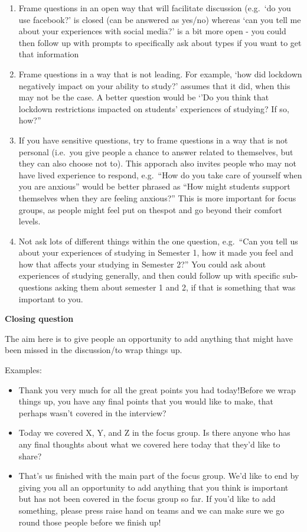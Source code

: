 \documentclass[
  english,
  letterpaper,
  DIV=11,
  numbers=noendperiod]{scrreprt}
\providecommand{\tightlist}{%
  \setlength{\itemsep}{0pt}\setlength{\parskip}{0pt}}
\begin{document}
\begin{enumerate}
\def\labelenumi{\arabic{enumi}.}
\item
  Frame questions in an open way that will facilitate discussion
  (e.g.~`do you use facebook?' is closed (can be answered as yes/no)
  whereas `can you tell me about your experiences with social media?' is
  a bit more open - you could then follow up with prompts to
  specifically ask about types if you want to get that information
\item
  Frame questions in a way that is not leading. For example, `how did
  lockdown negatively impact on your ability to study?' assumes that it
  did, when this may not be the case. A better question would be `'Do
  you think that lockdown restrictions impacted on students' experiences
  of studying? If so, how?''
\item
  If you have sensitive questions, try to frame questions in a way that
  is not personal (i.e.~you give people a chance to answer related to
  themselves, but they can also choose not to). This apporach also
  invites people who may not have lived experience to respond,
  e.g.~``How do you take care of yourself when you are anxious'' would
  be better phrased as ``How might students support themselves when they
  are feeling anxious?'' This is more important for focus groups, as
  people might feel put on thespot and go beyond their comfort levels.
\item
  Not ask lots of different things within the one question, e.g.~``Can
  you tell us about your experiences of studying in Semester 1, how it
  made you feel and how that affects your studying in Semester 2?'' You
  could ask about experiences of studying generally, and then could
  follow up with specific sub-questions asking them about semester 1 and
  2, if that is something that was important to you.
\end{enumerate}

\textbf{Closing question}

The aim here is to give people an opportunity to add anything that might
have been missed in the discussion/to wrap things up.

Examples:

\begin{itemize}
\tightlist
\item
  Thank you very much for all the great points you had today!Before we
  wrap things up, you have any final points that you would like to make,
  that perhaps wasn't covered in the interview?
\item
  Today we covered X, Y, and Z in the focus group. Is there anyone who
  has any final thoughts about what we covered here today that they'd
  like to share?
\item
  That's us finished with the main part of the focus group. We'd like to
  end by giving you all an opportunity to add anything that you think is
  important but has not been covered in the focus group so far. If you'd
  like to add something, please press raise hand on teams and we can
  make sure we go round those people before we finish up!
\end{itemize}
\end{document}
